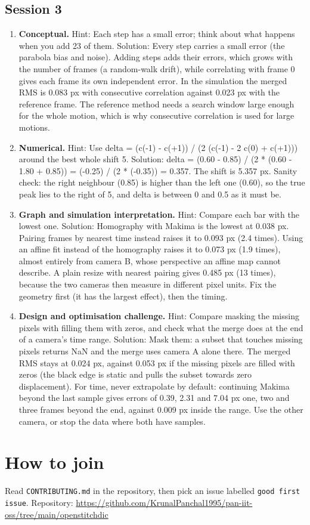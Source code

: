 \documentclass[11pt,a4paper]{article}
\begin{document}
\subsection*{Session 3}
\begin{enumerate}[nosep]
\item \textbf{Conceptual.} Hint: Each step has a small error; think about what happens when you add 23 of them. Solution: Every step carries a small error (the parabola bias and noise). Adding steps adds their errors, which grows with the number of frames (a random-walk drift), while correlating with frame 0 gives each frame its own independent error. In the simulation the merged RMS is 0.083 px with consecutive correlation against 0.023 px with the reference frame. The reference method needs a search window large enough for the whole motion, which is why consecutive correlation is used for large motions.
\item \textbf{Numerical.} Hint: Use delta = (c(-1) - c(+1)) / (2 (c(-1) - 2 c(0) + c(+1))) around the best whole shift 5. Solution: delta = (0.60 - 0.85) / (2 * (0.60 - 1.80 + 0.85)) = (-0.25) / (2 * (-0.35)) = 0.357. The shift is 5.357 px. Sanity check: the right neighbour (0.85) is higher than the left one (0.60), so the true peak lies to the right of 5, and delta is between 0 and 0.5 as it must be.
\item \textbf{Graph and simulation interpretation.} Hint: Compare each bar with the lowest one. Solution: Homography with Makima is the lowest at 0.038 px. Pairing frames by nearest time instead raises it to 0.093 px (2.4 times). Using an affine fit instead of the homography raises it to 0.073 px (1.9 times), almost entirely from camera B, whose perspective an affine map cannot describe. A plain resize with nearest pairing gives 0.485 px (13 times), because the two cameras then measure in different pixel units. Fix the geometry first (it has the largest effect), then the timing.
\item \textbf{Design and optimisation challenge.} Hint: Compare masking the missing pixels with filling them with zeros, and check what the merge does at the end of a camera's time range. Solution: Mask them: a subset that touches missing pixels returns NaN and the merge uses camera A alone there. The merged RMS stays at 0.024 px, against 0.053 px if the missing pixels are filled with zeros (the black edge is static and pulls the subset towards zero displacement). For time, never extrapolate by default: continuing Makima beyond the last sample gives errors of 0.39, 2.31 and 7.04 px one, two and three frames beyond the end, against 0.009 px inside the range. Use the other camera, or stop the data where both have samples.
\end{enumerate}

\section{How to join}
Read \texttt{CONTRIBUTING.md} in the repository, then pick an issue labelled \texttt{good first issue}. Repository: \url{https://github.com/KrunalPanchal1995/pan-iit-oss/tree/main/openstitchdic}
\end{document}
